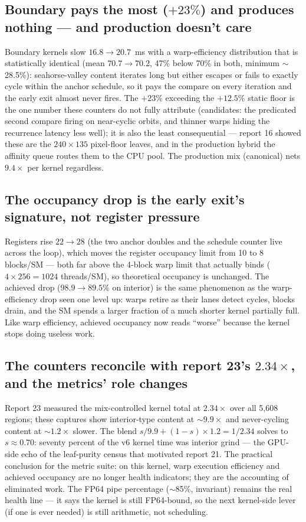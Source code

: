 \documentclass[
	english,
	letterpaper, oneside
]{article}
\begin{document}
\subsection{Boundary pays the most ($+23\%$) and produces nothing --- and
production doesn't care}

Boundary kernels slow $16.8 \to 20.7$~ms with a warp-efficiency
distribution that is statistically identical (mean $70.7 \to 70.2$, 47\%
below 70\% in both, minimum $\sim$28.5\%): seahorse-valley content
iterates long but either escapes or fails to exactly cycle within
the anchor schedule, so it pays the compare on every iteration and the
early exit almost never fires. The $+23\%$ exceeding the $+12.5\%$
static floor is the one number these counters do not fully attribute
(candidates: the predicated second compare firing on near-cyclic orbits,
and thinner warps hiding the recurrence latency less well); it is also the
least consequential --- report 16 showed these are the $240\times135$
pixel-floor leaves, and in the production hybrid the affinity queue routes
them to the CPU pool. The production mix (canonical) nets $9.4\times$ per
kernel regardless.

\subsection{The occupancy drop is the early exit's signature, not register
pressure}

Registers rise $22 \to 28$ (the two anchor doubles and the schedule
counter live across the loop), which moves the register occupancy limit
from 10 to 8 blocks/SM --- both far above the 4-block warp limit that
actually binds ($4 \times 256 = 1024$ threads/SM), so theoretical
occupancy is unchanged. The achieved drop ($98.9 \to 89.5\%$ on interior)
is the same phenomenon as the warp-efficiency drop seen one level up:
warps retire as their lanes detect cycles, blocks drain, and the SM
spends a larger fraction of a much shorter kernel partially full. Like
warp efficiency, achieved occupancy now reads ``worse'' because
the kernel stops doing useless work.

\subsection{The counters reconcile with report 23's $2.34\times$, and the
metrics' role changes}

Report 23 measured the mix-controlled kernel total at $2.34\times$ over
all 5{,}608 regions; these captures show interior-type content at
$\sim$$9.9\times$ and never-cycling content at $\sim$$1.2\times$ slower.
The blend $s/9.9 + (1-s)\times1.2 = 1/2.34$ solves to $s \approx 0.70$:
seventy percent of the v6 kernel time was interior grind --- the
GPU-side echo of the leaf-purity census that motivated report 21. The
practical conclusion for the metric suite: on this kernel, warp execution
efficiency and achieved occupancy are no longer health indicators; they
are the accounting of eliminated work. The FP64 pipe percentage
($\sim$85\%, invariant) remains the real health line --- it says the
kernel is still FP64-bound, so the next kernel-side lever (if one is ever
needed) is still arithmetic, not scheduling.
\end{document}
